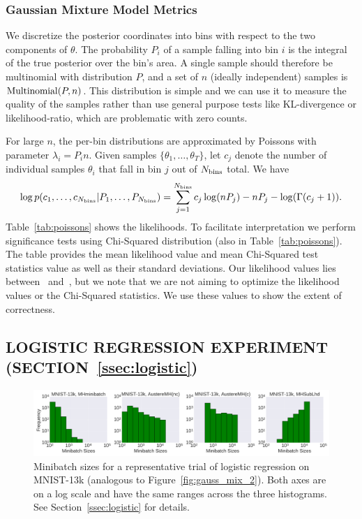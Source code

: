 \documentclass[letterpaper]{article}
\begin{document}
\subsubsection{Gaussian Mixture Model Metrics}\label{sssec:gauss_metrics}

We discretize the posterior coordinates into bins with respect to the two
components of $\theta$.  The probability $P_i$ of a sample falling into bin $i$
is the integral of the true posterior over the bin's area.  A single sample
should therefore be multinomial with distribution $P$, and a set of $n$ (ideally
independent) samples is ${\rm Multinomial}(P,n)$. This distribution is simple
and we can use it to measure the quality of the samples rather than use general
purpose tests like KL-divergence or likelihood-ratio, which are problematic with
zero counts.

For large $n$, the per-bin distributions are approximated by Poissons with
parameter $\lambda_i=P_i n$. Given samples $\{\theta_1,\ldots,\theta_T\}$, let
$c_j$ denote the number of individual samples $\theta_i$ that fall in bin $j$
out of $N_{\rm bins}$ total. We have
\begin{equation}\label{eq:log_prob_poissons}
\log p(c_1, \ldots, c_{N_{\rm bins}} | P_1, \ldots, P_{N_{\rm bins}}) =
\sum_{j=1}^{N_{\rm bins}} c_j \log (n P_j) - n P_j - \log(\Gamma(c_j+1)).
\end{equation}
Table~\ref{tab:poissons} shows the likelihoods. To facilitate interpretation we
perform significance tests using Chi-Squared distribution (also in
Table~\ref{tab:poissons}). The table provides the mean likelihood value and mean
Chi-Squared test statistics value as well as their standard deviations.  Our
likelihood values lies between~\citep{cutting_mh_2014}
and~\citep{icml2014c1_bardenet14}, but we note that we are not aiming to
optimize the likelihood values or the Chi-Squared statistics.  We use these
values to show the extent of correctness.

\subsection{LOGISTIC REGRESSION EXPERIMENT (SECTION~\ref{ssec:logistic})}\label{app:logistic}

\begin{figure}[t]
	\centering
    \includegraphics[width=0.9\linewidth]{logistic_regression_histograms_mnist.png}
	\caption{
    Minibatch sizes for a representative trial of logistic regression on
    MNIST-13k (analogous to Figure~\ref{fig:gauss_mix_2}). Both axes are on a
    log scale and have the same ranges across the three histograms. See
    Section~\ref{ssec:logistic} for details.
    }
	\label{fig:logistic_histograms_mnist}
\end{figure}
\end{document}
